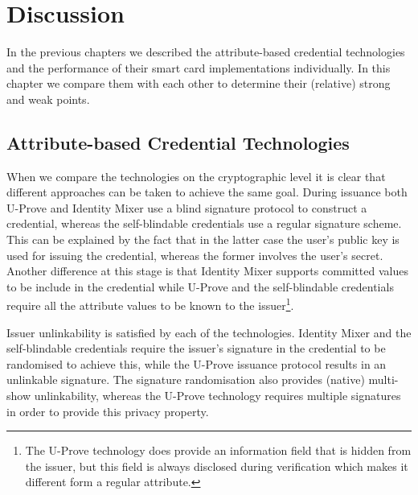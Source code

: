 \chapter{Discussion\label{chp:discussion}}

In the previous chapters we described the attribute-based credential
technologies and the performance of their smart card implementations
individually. In this chapter we compare them with each other to determine their
(relative) strong and weak points.

\section{Attribute-based Credential Technologies}

When we compare the technologies on the cryptographic level it is clear that
different approaches can be taken to achieve the same goal. During issuance both
U-Prove and Identity Mixer use a blind signature protocol to construct a
credential, whereas the self-blindable credentials use a regular signature
scheme. This can be explained by the fact that in the latter case the user's
public key is used for issuing the credential, whereas the former involves the
user's secret. Another difference at this stage is that Identity Mixer supports
committed values to be include in the credential while U-Prove and the
self-blindable credentials require all the attribute values to be known to the
issuer\footnote{The U-Prove technology does provide an information field that
is hidden from the issuer, but this field is always disclosed during
verification which makes it different form a regular attribute.}.

Issuer unlinkability is satisfied by each of the technologies. Identity Mixer
and the self-blindable credentials require the issuer's signature in the
credential to be randomised to achieve this, while the U-Prove issuance protocol
results in an unlinkable signature. The signature randomisation also provides
(native) multi-show unlinkability, whereas the U-Prove technology requires
multiple signatures in order to provide this privacy property.

